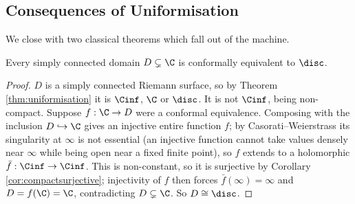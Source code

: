 \begin{center}
\end{center}

\subsection{Consequences of Uniformisation}

We close with two classical theorems which fall out of the machine.

\begin{theorem}
	Every simply connected domain $D \subsetneq \C$ is conformally equivalent to $\disc$.
\end{theorem}

\begin{proof}
	$D$ is a simply connected Riemann surface, so by Theorem \ref{thm:uniformisation} it is
	$\Cinf$, $\C$ or $\disc$. It is not $\Cinf$, being non-compact. Suppose
	$f : \C \to D$ were a conformal equivalence. Composing with the inclusion
	$D \hookrightarrow \C$ gives an injective entire function $f$; by
	Casorati--Weierstrass its singularity at $\infty$ is not essential (an injective
	function cannot take values densely near $\infty$ while being open near a fixed finite
	point), so $f$ extends to a holomorphic $\bar f : \Cinf\to\Cinf$. This is non-constant,
	so it is surjective by Corollary \ref{cor:compactsurjective}; injectivity of $f$ then
	forces $\bar f(\infty)=\infty$ and $D = f(\C) = \C$, contradicting $D \subsetneq\C$.
	So $D\cong\disc$.
\end{proof}

